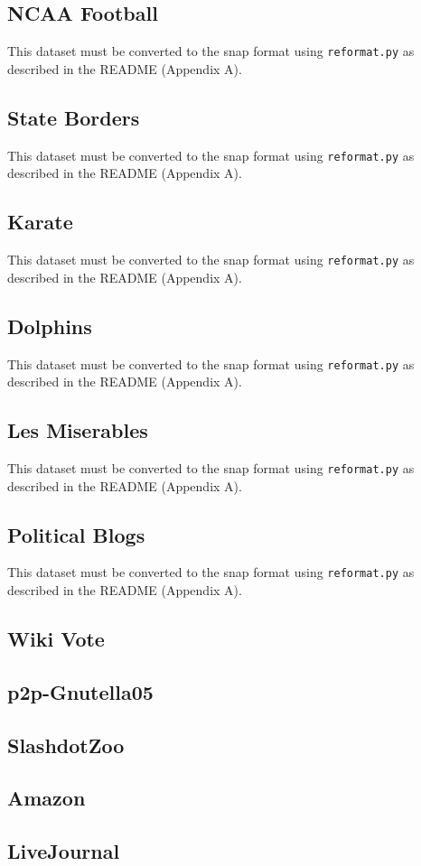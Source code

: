\documentclass[draft]{report}
\begin{document}
\subsection{NCAA Football}
This dataset must be converted to the snap format using \texttt{reformat.py} as described in the README (Appendix A).
\subsection{State Borders}
This dataset must be converted to the snap format using \texttt{reformat.py} as described in the README (Appendix A).
\subsection{Karate}
This dataset must be converted to the snap format using \texttt{reformat.py} as described in the README (Appendix A).
\subsection{Dolphins}
This dataset must be converted to the snap format using \texttt{reformat.py} as described in the README (Appendix A).
\subsection{Les Miserables}
This dataset must be converted to the snap format using \texttt{reformat.py} as described in the README (Appendix A).
\subsection{Political Blogs}
This dataset must be converted to the snap format using \texttt{reformat.py} as described in the README (Appendix A).
\subsection{Wiki Vote}
\subsection{p2p-Gnutella05}
\subsection{SlashdotZoo}
\subsection{Amazon}
\subsection{LiveJournal}
\end{document}
